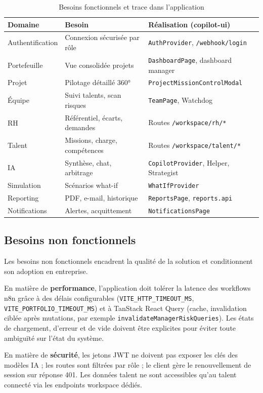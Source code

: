 \begin{table}[htbp]
\centering
\caption{Besoins fonctionnels et trace dans l'application}
\label{tab:besoins-ch1}
\begin{tabular}{@{}p{2.6cm}p{5.4cm}p{4.6cm}@{}}
\toprule
\textbf{Domaine} & \textbf{Besoin} & \textbf{Réalisation (copilot-ui)} \\
\midrule
Authentification & Connexion sécurisée par rôle & \texttt{AuthProvider}, \texttt{/webhook/login} \\
Portefeuille & Vue consolidée projets & \texttt{DashboardPage}, dashboard manager \\
Projet & Pilotage détaillé 360° & \texttt{ProjectMissionControlModal} \\
Équipe & Suivi talents, scan risques & \texttt{TeamPage}, Watchdog \\
RH & Référentiel, écarts, demandes & Routes \texttt{/workspace/rh/*} \\
Talent & Missions, charge, compétences & Routes \texttt{/workspace/talent/*} \\
IA & Synthèse, chat, arbitrage & \texttt{CopilotProvider}, Helper, Strategist \\
Simulation & Scénarios what-if & \texttt{WhatIfProvider} \\
Reporting & PDF, e-mail, historique & \texttt{ReportsPage}, \texttt{reports.api} \\
Notifications & Alertes, acquittement & \texttt{NotificationsPage} \\
\bottomrule
\end{tabular}
\end{table}

\subsection{Besoins non fonctionnels}

Les besoins non fonctionnels encadrent la qualité de la solution et conditionnent son adoption en entreprise.

En matière de \textbf{performance}, l'application doit tolérer la latence des workflows n8n grâce à des délais configurables (\texttt{VITE\_HTTP\_TIMEOUT\_MS}, \texttt{VITE\_PORTFOLIO\_TIMEOUT\_MS}) et à TanStack React Query (cache, invalidation ciblée après mutations, par exemple \texttt{invalidateManagerRiskQueries}). Les états de chargement, d'erreur et de vide doivent être explicites pour éviter toute ambiguïté sur l'état du système.

En matière de \textbf{sécurité}, les jetons JWT ne doivent pas exposer les clés des modèles IA ; les routes sont filtrées par rôle ; le client gère le renouvellement de session sur réponse 401. Les données talent ne sont accessibles qu'au talent connecté via les endpoints workspace dédiés.

